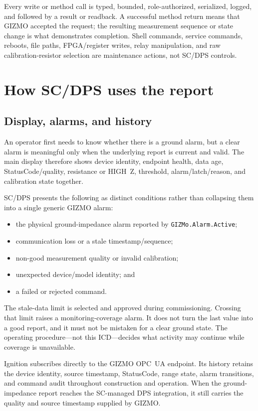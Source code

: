 \documentclass{cernatlasnote}
\newcommand{\code}[1]{\nolinkurl{#1}}
\begin{document}
Every write or method call is typed, bounded, role-authorized, serialized,
logged, and followed by a result or readback. A successful method return means
that GIZMO accepted the request; the resulting measurement sequence or state
change is what demonstrates completion. Shell commands, service commands,
reboots, file paths, FPGA/register writes, relay manipulation, and raw
calibration-resistor selection are maintenance actions, not SC/DPS controls.

\section{How SC/DPS uses the report}

\subsection{Display, alarms, and history}

An operator first needs to know whether there is a ground alarm, but a clear
alarm is meaningful only when the underlying report is current and valid. The
main display therefore shows device identity, endpoint health, data age,
StatusCode/quality, resistance or HIGH~Z, threshold, alarm/latch/reason, and
calibration state together.

SC/DPS presents the following as distinct conditions rather than collapsing
them into a single generic GIZMO alarm:

\begin{itemize}
  \item the physical ground-impedance alarm reported by
  \code{GIZMo.Alarm.Active};
  \item communication loss or a stale timestamp/sequence;
  \item non-good measurement quality or invalid calibration;
  \item unexpected device/model identity; and
  \item a failed or rejected command.
\end{itemize}

The stale-data limit is selected and approved during commissioning. Crossing
that limit raises a monitoring-coverage alarm. It does not turn the last value
into a good report, and it must not be mistaken for a clear ground state. The
operating procedure---not this ICD---decides what activity may continue while
coverage is unavailable.

Ignition subscribes directly to the GIZMO OPC~UA endpoint. Its history retains
the device identity, source timestamp, StatusCode, range state, alarm
transitions, and command audit throughout construction and operation. When the
ground-impedance report reaches the SC-managed DPS integration, it still carries
the quality and source timestamp supplied by GIZMO.
\end{document}

